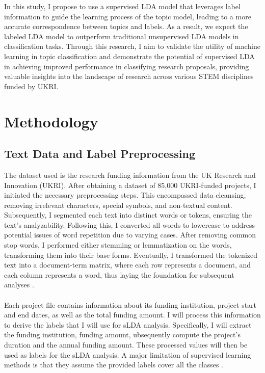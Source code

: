 \documentclass[12pt,twoside]{article}
\begin{document}
In this study, I propose to use a supervised LDA model that leverages label information to guide the learning process of the topic model, leading to a more accurate correspondence between topics and labels. As a result, we expect the labeled LDA model to outperform traditional unsupervised LDA models in classification tasks. Through this research, I aim to validate the utility of machine learning in topic classification and demonstrate the potential of supervised LDA in achieving improved performance in classifying research proposals, providing valuable insights into the landscape of research across various STEM disciplines funded by UKRI.


\section{Methodology}

\subsection{Text Data and Label Preprocessing}

The dataset used is the research funding information from the UK Research and Innovation (UKRI). After obtaining a dataset of 85,000 UKRI-funded projects, I initiated the necessary preprocessing steps. This encompassed data cleansing, removing irrelevant characters, special symbols, and non-textual content. Subsequently, I segmented each text into distinct words or tokens, ensuring the text's analyzability. Following this, I converted all words to lowercase to address potential issues of word repetition due to varying cases. After removing common stop words, I performed either stemming or lemmatization on the words, transforming them into their base forms. Eventually, I transformed the tokenized text into a document-term matrix, where each row represents a document, and each column represents a word, thus laying the foundation for subsequent analyses \cite{kochmar2022getting}. \\\\

Each project file contains information about its funding institution, project start and end dates, as well as the total funding amount. I will process this information to derive the labels that I will use for sLDA analysis. Specifically, I will extract the funding institution, funding amount, ubsequently compute the project's duration and the annual funding amount. These processed values will then be used as labels for the sLDA analysis. A major limitation of supervised learning methods is that they assume the provided labels cover all the classes \cite{Kang2014}. \\\\
\end{document}
